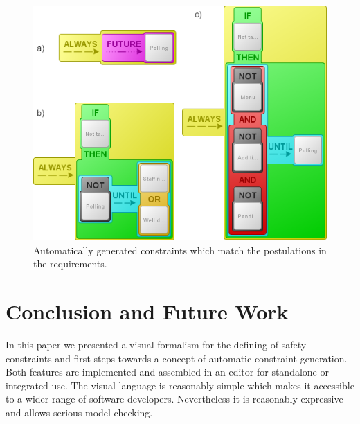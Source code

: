 \documentclass[conference]{IEEEtran}
\begin{document}
\begin{figure}[htbp]
  \centering
  \includegraphics[width=\linewidth]{generatedconstraints} %
  \caption{Automatically generated constraints which match the postulations in the requirements.}
  \label{fig:generatedconstraints}
\end{figure}







\section{Conclusion and Future Work}

In this paper we presented a visual formalism for the defining of safety constraints and first steps towards a concept of automatic constraint generation. Both features are implemented and assembled in an editor for standalone or integrated use. The visual language is reasonably simple which makes it accessible to a wider range of software developers. Nevertheless it is reasonably expressive and allows serious model checking.
\end{document}
